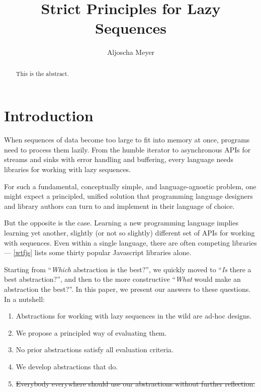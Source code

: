 \documentclass[sigplan,screen,10pt,anonymous,review]{acmart}
\title{Strict Principles for Lazy Sequences}
\author{Aljoscha Meyer}
\affiliation{TU Berlin, Germany}
\begin{document}
\begin{abstract}
This is the abstract.
\end{abstract}

\maketitle

\section{Introduction}\label{introduction}

When sequences of data become too large to fit into memory at once, programs need to process them lazily. From the humble iterator to asynchronous APIs for streams and sinks with error handling and buffering, every language needs libraries for working with lazy sequences.

For such a fundamental, conceptually simple, and language-agnostic problem, one might expect a principled, unified solution that programming language designers and library authors can turn to and implement in their language of choice.

But the opposite is the case. Learning a new programming language implies learning yet another, slightly (or not so slightly) different set of APIs for working with sequences. Even within a single language, there are often competing libraries --- \cref{wtfjs} lists some thirty popular Javascript libraries alone.

Starting from ``\textit{Which} abstraction is the best?'', we quickly moved to ``\textit{Is} there a best abstraction?'', and then to the more constructive ``\textit{What} would make an abstraction the best?''. In this paper, we present our answers to these questions. In a nutshell:

\begin{enumerate}
    \item Abstractions for working with lazy sequences in the wild are ad-hoc designs.
    \item We propose a principled way of evaluating them.
    \item No prior abstractions satisfy all evaluation criteria.
    \item We develop abstractions that do.
    \item \sout{Everybody everywhere should use our abstractions without further reflection.}
\end{enumerate}
\end{document}

